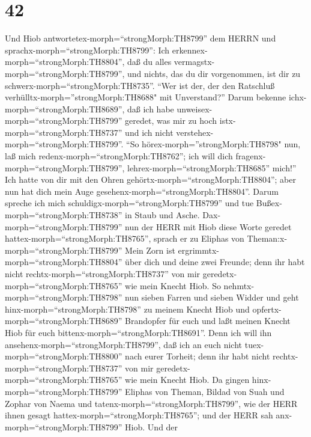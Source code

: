 \hypertarget{section-41}{%
\section{42}\label{section-41}}

 Und Hiob antwortetex-morph=``strongMorph:TH8799'' dem HERRN
und sprachx-morph=``strongMorph:TH8799'':  Ich
erkennex-morph=``strongMorph:TH8804'', daß du alles
vermagstx-morph=``strongMorph:TH8799'', und nichts, das du dir
vorgenommen, ist dir zu schwerx-morph=``strongMorph:TH8735''.
 ``Wer ist der, der den Ratschluß
verhülltx-morph=''strongMorph:TH8688" mit Unverstand?'' Darum bekenne
ichx-morph=``strongMorph:TH8689'', daß ich habe
unweisex-morph=``strongMorph:TH8799'' geredet, was mir zu hoch
istx-morph=``strongMorph:TH8737'' und ich nicht
verstehex-morph=``strongMorph:TH8799''.  ``So
hörex-morph=''strongMorph:TH8798" nun, laß mich
redenx-morph=``strongMorph:TH8762''; ich will dich
fragenx-morph=``strongMorph:TH8799'',
lehrex-morph=``strongMorph:TH8685'' mich!''  Ich hatte von
dir mit den Ohren gehörtx-morph=``strongMorph:TH8804''; aber nun hat
dich mein Auge gesehenx-morph=``strongMorph:TH8804''.  Darum
spreche ich mich schuldigx-morph=``strongMorph:TH8799'' und tue
Bußex-morph=``strongMorph:TH8738'' in Staub und Asche. 
Dax-morph=``strongMorph:TH8799'' nun der HERR mit Hiob diese Worte
geredet hattex-morph=``strongMorph:TH8765'', sprach er zu Eliphas von
Theman:x-morph=``strongMorph:TH8799'' Mein Zorn ist
ergrimmtx-morph=``strongMorph:TH8804'' über dich und deine zwei Freunde;
denn ihr habt nicht rechtx-morph=``strongMorph:TH8737'' von mir
geredetx-morph=``strongMorph:TH8765'' wie mein Knecht Hiob. 
So nehmtx-morph=``strongMorph:TH8798'' nun sieben Farren und sieben
Widder und geht hinx-morph=``strongMorph:TH8798'' zu meinem Knecht Hiob
und opfertx-morph=``strongMorph:TH8689'' Brandopfer für euch und laßt
meinen Knecht Hiob für euch bittenx-morph=``strongMorph:TH8691''. Denn
ich will ihn ansehenx-morph=``strongMorph:TH8799'', daß ich an euch
nicht tuex-morph=``strongMorph:TH8800'' nach eurer Torheit; denn ihr
habt nicht rechtx-morph=``strongMorph:TH8737'' von mir
geredetx-morph=``strongMorph:TH8765'' wie mein Knecht Hiob. 
Da gingen hinx-morph=``strongMorph:TH8799'' Eliphas von Theman, Bildad
von Suah und Zophar von Naema und tatenx-morph=``strongMorph:TH8799'',
wie der HERR ihnen gesagt hattex-morph=``strongMorph:TH8765''; und der
HERR sah anx-morph=``strongMorph:TH8799'' Hiob.  Und der
